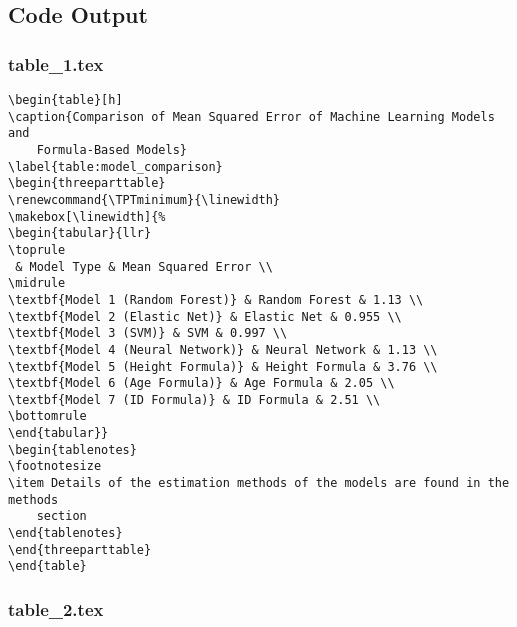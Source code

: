 \documentclass[11pt]{article}
\begin{document}
\subsection{Code Output}

\subsubsection*{table\_1.tex}

\begin{Verbatim}[tabsize=4]
\begin{table}[h]
\caption{Comparison of Mean Squared Error of Machine Learning Models and
	Formula-Based Models}
\label{table:model_comparison}
\begin{threeparttable}
\renewcommand{\TPTminimum}{\linewidth}
\makebox[\linewidth]{%
\begin{tabular}{llr}
\toprule
 & Model Type & Mean Squared Error \\
\midrule
\textbf{Model 1 (Random Forest)} & Random Forest & 1.13 \\
\textbf{Model 2 (Elastic Net)} & Elastic Net & 0.955 \\
\textbf{Model 3 (SVM)} & SVM & 0.997 \\
\textbf{Model 4 (Neural Network)} & Neural Network & 1.13 \\
\textbf{Model 5 (Height Formula)} & Height Formula & 3.76 \\
\textbf{Model 6 (Age Formula)} & Age Formula & 2.05 \\
\textbf{Model 7 (ID Formula)} & ID Formula & 2.51 \\
\bottomrule
\end{tabular}}
\begin{tablenotes}
\footnotesize
\item Details of the estimation methods of the models are found in the methods
	section
\end{tablenotes}
\end{threeparttable}
\end{table}

\end{Verbatim}

\subsubsection*{table\_2.tex}
\end{document}
